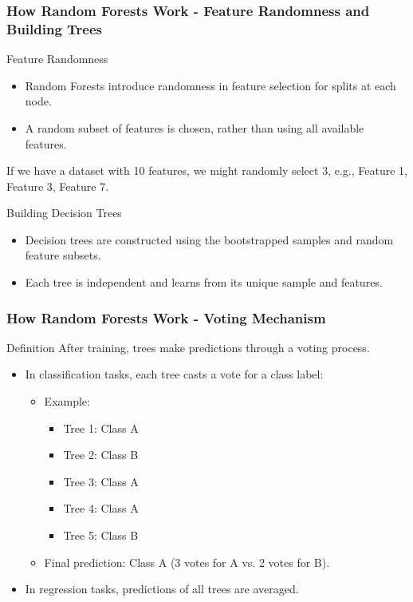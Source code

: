 \documentclass{beamer}
\begin{document}
\begin{frame}[fragile]
    \frametitle{How Random Forests Work - Feature Randomness and Building Trees}
    \begin{block}{Feature Randomness}
        \begin{itemize}
            \item Random Forests introduce randomness in feature selection for splits at each node.
            \item A random subset of features is chosen, rather than using all available features.
        \end{itemize}
        \begin{example}
            If we have a dataset with 10 features, we might randomly select 3, e.g., Feature 1, Feature 3, Feature 7.
        \end{example}
    \end{block}
    \begin{block}{Building Decision Trees}
        \begin{itemize}
            \item Decision trees are constructed using the bootstrapped samples and random feature subsets.
            \item Each tree is independent and learns from its unique sample and features.
        \end{itemize}
    \end{block}
\end{frame}

\begin{frame}[fragile]
    \frametitle{How Random Forests Work - Voting Mechanism}
    \begin{block}{Definition}
        After training, trees make predictions through a voting process.
    \end{block}
    \begin{itemize}
        \item In classification tasks, each tree casts a vote for a class label:
        \begin{itemize}
            \item Example:
            \begin{itemize}
                \item Tree 1: Class A
                \item Tree 2: Class B
                \item Tree 3: Class A
                \item Tree 4: Class A
                \item Tree 5: Class B
            \end{itemize}
            \item Final prediction: Class A (3 votes for A vs. 2 votes for B).
        \end{itemize}
        \item In regression tasks, predictions of all trees are averaged.
    \end{itemize}
\end{frame}
\end{document}
